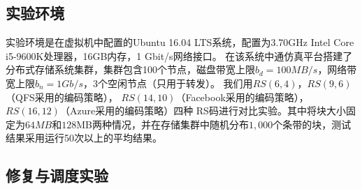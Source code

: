 \subsection{实验环境}
实验环境是在虚拟机中配置的Ubuntu 16.04 LTS系统，配置为3.70GHz Intel Core i5-9600K处理器，16GB内存，1 Gbit/s网络接口。
在该系统中通仿真平台搭建了分布式存储系统集群，集群包含100个节点，磁盘带宽上限$b_d=100MB/s$，网络带宽上限$b_n=1Gb/s$，3个空闲节点（只用于转发）。
我们用$RS(6,4)$，$RS(9,6)$\cite{ovsiannikov2013quantcast}（QFS采用的编码策略），
$RS(14,10)$\cite{muralidhar2014f4}（Facebook采用的编码策略），$RS(16,12)$\cite{huang2012erasure}（Azure采用的编码策略）四种
RS码进行对比实验。其中将块大小固定为$64MB$和$128$MB两种情况，并在存储集群中随机分布$1,000$个条带的块，测试结果采用运行50次以上的平均结果。




\subsection{修复与调度实验}

